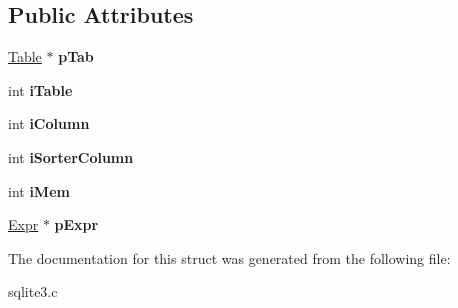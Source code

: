 \subsection*{Public Attributes}
\begin{DoxyCompactItemize}
\item 
\hypertarget{struct_agg_info_1_1_agg_info__col_ad2f2ae137b49e72d28a57accc9d06386}{\hyperlink{struct_table}{Table} $\ast$ {\bfseries p\-Tab}}\label{struct_agg_info_1_1_agg_info__col_ad2f2ae137b49e72d28a57accc9d06386}

\item 
\hypertarget{struct_agg_info_1_1_agg_info__col_ab49aa2fbfc6278c86b64497a6807c113}{int {\bfseries i\-Table}}\label{struct_agg_info_1_1_agg_info__col_ab49aa2fbfc6278c86b64497a6807c113}

\item 
\hypertarget{struct_agg_info_1_1_agg_info__col_a4cad2ce99ddf7425d358d49e40524f6b}{int {\bfseries i\-Column}}\label{struct_agg_info_1_1_agg_info__col_a4cad2ce99ddf7425d358d49e40524f6b}

\item 
\hypertarget{struct_agg_info_1_1_agg_info__col_ae3901ad0d5b6d519a7559358f1f7248b}{int {\bfseries i\-Sorter\-Column}}\label{struct_agg_info_1_1_agg_info__col_ae3901ad0d5b6d519a7559358f1f7248b}

\item 
\hypertarget{struct_agg_info_1_1_agg_info__col_ae22f3dfc6f9c2dc647be1b9fbd14e896}{int {\bfseries i\-Mem}}\label{struct_agg_info_1_1_agg_info__col_ae22f3dfc6f9c2dc647be1b9fbd14e896}

\item 
\hypertarget{struct_agg_info_1_1_agg_info__col_a60f23ec0abfcc88cab7083967a3abd9e}{\hyperlink{struct_expr}{Expr} $\ast$ {\bfseries p\-Expr}}\label{struct_agg_info_1_1_agg_info__col_a60f23ec0abfcc88cab7083967a3abd9e}

\end{DoxyCompactItemize}


The documentation for this struct was generated from the following file\-:\begin{DoxyCompactItemize}
\item 
sqlite3.\-c\end{DoxyCompactItemize}
